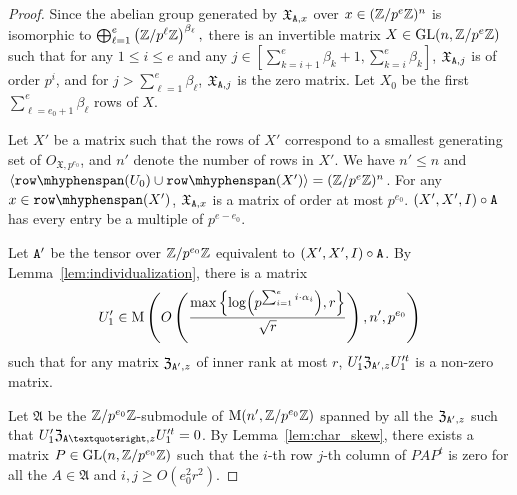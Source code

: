 \begin{proof}
Since the abelian group generated by $\mathfrak{X}_{\mathtt{A}, x}$ over $x \in (\mathbb{Z} / p^{e}\mathbb{Z})^n$ is isomorphic to $\bigoplus_{\ell = 1}^{e} \left(\mathbb{Z} / p^{\ell } \mathbb{Z}\right)^{\beta_\ell},$
there is an invertible matrix $X \in \mathrm{GL}(n, \mathbb{Z} / p^{e}\mathbb{Z})$ such that for any $1 \leq i \leq e$ and any $j\in[\sum_{k = i + 1}^{e} \beta_k + 1, \sum_{k = i}^{e} \beta_k]$,
$\mathfrak{X}_{\mathtt{A}, j}$ is of order $p^i$, and for $j > \sum_{\ell = 1}^{e} \beta_\ell$,   $\mathfrak{X}_{\mathtt{A}, j}$ is the zero matrix.
Let $X_0$ be the first $\sum_{\ell = e_0 + 1}^{e} \beta_\ell$ rows of $X$. 

Let $X'$ be a matrix such that the rows of $X'$ correspond to a smallest generating set of $O_{\mathfrak{X}, p^{e_0}}$, and $n'$ denote the number of rows in $X'$. We have $n' \leq n$ and $\langle \rowspan(U_0) \cup \rowspan(X')\rangle = (\Z / p^e \Z)^n$.
For any $x \in \rowspan(X')$, $\mathfrak{X}_{\mathtt{A}, x}$ is a matrix of order at most $p^{e_0}$. 
$(X', X', I) \circ \mathtt{A}$ has every entry be a multiple of $p^{e - e_0}$. 


Let $\mathtt{A}'$ be the tensor over $\mathbb{Z} / p^{e_0} \mathbb{Z}$ equivalent to $(X', X', I) \circ \mathtt{A}$. 
By Lemma~\ref{lem:individualization}, %
there is a matrix 
\[U_{1}' \in \mathrm{M}\left(O\left(\frac{\max\left\{\log(p^{\sum_{i = 1}^{e} i \cdot \alpha_i}), r\right\}}{ \sqrt{r}}\right), n', p^{e_0}\right)\] such that 
for any matrix $\mathfrak{Z}_{\mathtt{A}', z}$ of inner rank at most $r$, $U_{1}' \mathfrak{Z}_{\mathtt{A}', z} U_{1}'^t$ is a non-zero matrix. 

Let $\mathfrak{A}$ be the $\mathbb{Z} / p^{e_0}\mathbb{Z}$-submodule of $\mathrm{M}(n', \mathbb{Z} / p^{e_0} \mathbb{Z})$ spanned by all the $\mathfrak{Z}_{\mathtt{A}', z}$ such that $U_{1}'\mathfrak{Z}_{\tA’, z} U_{1}'^t = 0$. 
By Lemma~\ref{lem:char_skew}, there exists a matrix $P \in \mathrm{GL}(n, \mathbb{Z} / p^{e_0} \mathbb{Z})$ such that the $i$-th row $j$-th column of $P A P^t$ is zero for all the $A \in \mathfrak{A}$ and $i, j \geq O(e_0^2r^2)$. 


\end{proof}

